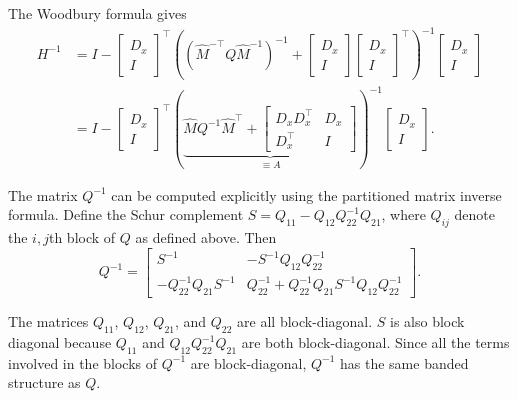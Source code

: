 \documentclass{article}
\begin{document}
The Woodbury formula gives
\begin{align}
    H^{-1} & = I -
    \begin{bmatrix}
        D_x \\ I
    \end{bmatrix}
    ^\top
    \left( \left(\hat{M}^{-\top} Q \hat{M}^{-1}\right)^{-1} +
    \begin{bmatrix}
        D_x \\ I
    \end{bmatrix}
    \begin{bmatrix}
        D_x \\ I
    \end{bmatrix}
    ^\top
    \right)^{-1}
    \begin{bmatrix}
        D_x \\ I
    \end{bmatrix}
    \nonumber      \\
           & = I -
    \begin{bmatrix}
        D_x \\ I
    \end{bmatrix}
    ^\top
    \left(\underbrace{
        \hat{M} Q^{-1} \hat{M}^\top
        +
        \begin{bmatrix}
            D_x D_x^\top & D_x \\
            D_x^\top     & I
        \end{bmatrix}
    }_{\equiv A}\right)^{-1}
    \begin{bmatrix}
        D_x \\ I
    \end{bmatrix}
    .
\end{align}

The matrix $Q^{-1}$ can be computed explicitly using the partitioned matrix
inverse formula. Define the Schur complement $S = Q_{11} - Q_{12} Q_{22}^{-1}
    Q_{21}$, where $Q_{ij}$ denote the $i,j$th block of $Q$ as defined above. Then
\begin{equation}
    Q^{-1} =
    \begin{bmatrix}
        S^{-1}                      & -S^{-1} Q_{12} Q_{22}^{-1}                                 \\
        - Q_{22}^{-1} Q_{21} S^{-1} & Q_{22}^{-1} + Q_{22}^{-1} Q_{21} S^{-1} Q_{12} Q_{22}^{-1}
    \end{bmatrix}
    .
\end{equation}

The matrices $Q_{11}$, $Q_{12}$, $Q_{21}$, and $Q_{22}$ are all block-diagonal.
$S$ is also block diagonal because $Q_{11}$ and $Q_{12} Q_{22}^{-1} Q_{21}$ are
both block-diagonal. Since all the terms involved in the blocks of $Q^{-1}$ are
block-diagonal, $Q^{-1}$ has the same banded structure as $Q$.
\end{document}
